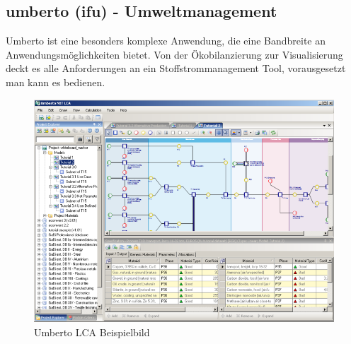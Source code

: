 \documentclass[a4paper, 12pt, twoside, BCOR=20mm, DIV=calc, abstracton, parskip=half*, toc=bibliography, toc=listof, headsepline, footsepline, headings=small, numbers=enddot]{scrreprt}
\begin{document}
	\subsection{umberto (ifu) - Umweltmanagement}
	Umberto ist eine besonders komplexe Anwendung, die eine Bandbreite an Anwendungsmöglichkeiten bietet. Von der Ökobilanzierung zur Visualisierung deckt es alle Anforderungen an ein Stoffstrommanagement Tool, vorausgesetzt man kann es bedienen. 
	
	\begin{figure}
		\includegraphics[width=\textwidth]{Bild/Umberto NXT LCA.png}
		\caption{Umberto LCA Beispielbild} 
	\end{figure}
	
\end{document}
